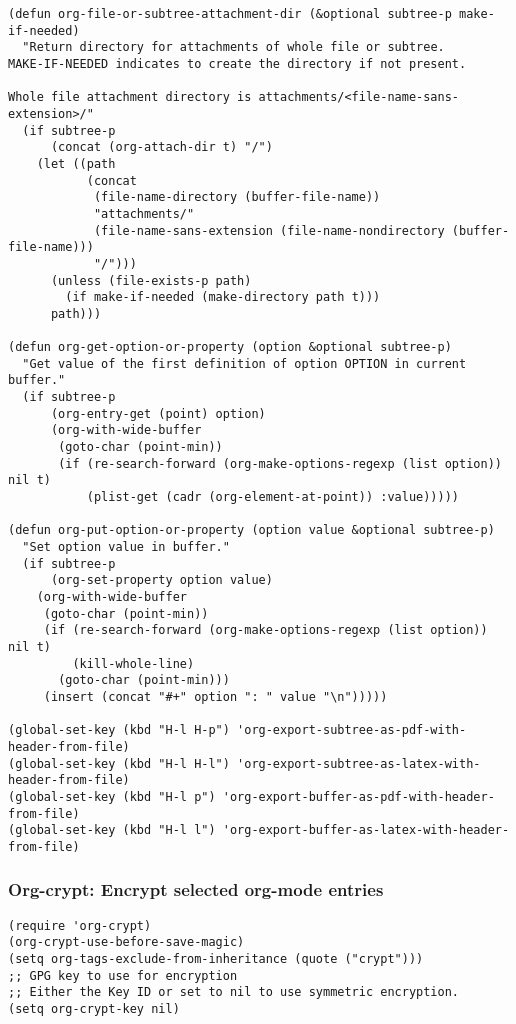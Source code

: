 \documentclass[nofonts]{tufte-handout}
\begin{document}
\begin{enumerate}
\begin{enumerate}
\begin{verbatim}
(defun org-file-or-subtree-attachment-dir (&optional subtree-p make-if-needed)
  "Return directory for attachments of whole file or subtree.
MAKE-IF-NEEDED indicates to create the directory if not present.

Whole file attachment directory is attachments/<file-name-sans-extension>/"
  (if subtree-p
      (concat (org-attach-dir t) "/")
    (let ((path
           (concat
            (file-name-directory (buffer-file-name))
            "attachments/"
            (file-name-sans-extension (file-name-nondirectory (buffer-file-name)))
            "/")))
      (unless (file-exists-p path)
        (if make-if-needed (make-directory path t)))
      path)))

(defun org-get-option-or-property (option &optional subtree-p)
  "Get value of the first definition of option OPTION in current buffer."
  (if subtree-p
      (org-entry-get (point) option)
      (org-with-wide-buffer
       (goto-char (point-min))
       (if (re-search-forward (org-make-options-regexp (list option)) nil t)
           (plist-get (cadr (org-element-at-point)) :value)))))

(defun org-put-option-or-property (option value &optional subtree-p)
  "Set option value in buffer."
  (if subtree-p
      (org-set-property option value)
    (org-with-wide-buffer
     (goto-char (point-min))
     (if (re-search-forward (org-make-options-regexp (list option)) nil t)
         (kill-whole-line)
       (goto-char (point-min)))
     (insert (concat "#+" option ": " value "\n")))))

(global-set-key (kbd "H-l H-p") 'org-export-subtree-as-pdf-with-header-from-file)
(global-set-key (kbd "H-l H-l") 'org-export-subtree-as-latex-with-header-from-file)
(global-set-key (kbd "H-l p") 'org-export-buffer-as-pdf-with-header-from-file)
(global-set-key (kbd "H-l l") 'org-export-buffer-as-latex-with-header-from-file)
\end{verbatim}
\end{enumerate}
\end{enumerate}


\subsubsection{Org-crypt: Encrypt selected org-mode entries}
\label{sec-2-5-12}

\begin{verbatim}
(require 'org-crypt)
(org-crypt-use-before-save-magic)
(setq org-tags-exclude-from-inheritance (quote ("crypt")))
;; GPG key to use for encryption
;; Either the Key ID or set to nil to use symmetric encryption.
(setq org-crypt-key nil)
\end{verbatim}
\end{document}
